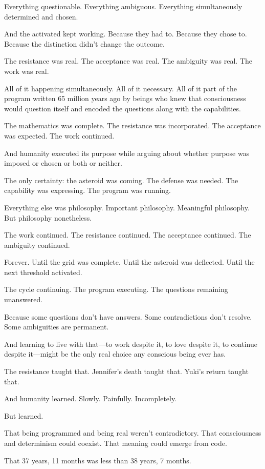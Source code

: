Everything questionable. Everything ambiguous. Everything simultaneously determined and chosen.

And the activated kept working. Because they had to. Because they chose to. Because the distinction didn't change the outcome.

The resistance was real. The acceptance was real. The ambiguity was real. The work was real.

All of it happening simultaneously. All of it necessary. All of it part of the program written 65 million years ago by beings who knew that consciousness would question itself and encoded the questions along with the capabilities.

The mathematics was complete. The resistance was incorporated. The acceptance was expected. The work continued.

And humanity executed its purpose while arguing about whether purpose was imposed or chosen or both or neither.

The only certainty: the asteroid was coming. The defense was needed. The capability was expressing. The program was running.

Everything else was philosophy. Important philosophy. Meaningful philosophy. But philosophy nonetheless.

The work continued. The resistance continued. The acceptance continued. The ambiguity continued.

Forever. Until the grid was complete. Until the asteroid was deflected. Until the next threshold activated.

The cycle continuing. The program executing. The questions remaining unanswered.

Because some questions don't have answers. Some contradictions don't resolve. Some ambiguities are permanent.

And learning to live with that—to work despite it, to love despite it, to continue despite it—might be the only real choice any conscious being ever has.

The resistance taught that. Jennifer's death taught that. Yuki's return taught that.

And humanity learned. Slowly. Painfully. Incompletely.

But learned.

That being programmed and being real weren't contradictory. That consciousness and determinism could coexist. That meaning could emerge from code.

That 37 years, 11 months was less than 38 years, 7 months.

